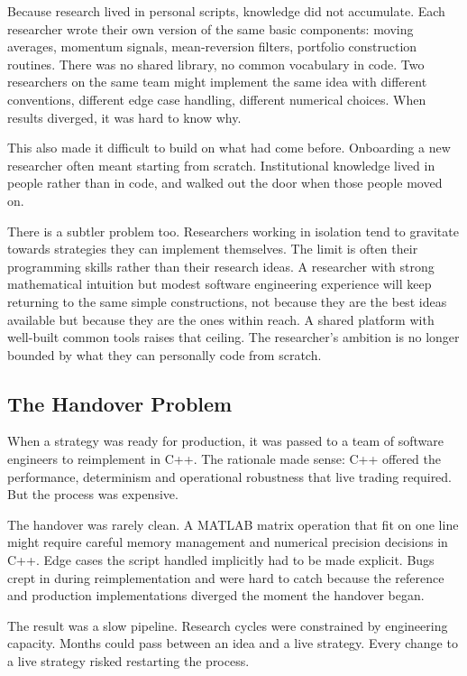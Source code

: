 \documentclass[
  11pt,
]{article}
\begin{document}
Because research lived in personal scripts, knowledge did not
accumulate. Each researcher wrote their own version of the same basic
components: moving averages, momentum signals, mean-reversion filters,
portfolio construction routines. There was no shared library, no common
vocabulary in code. Two researchers on the same team might implement the
same idea with different conventions, different edge case handling,
different numerical choices. When results diverged, it was hard to know
why.

This also made it difficult to build on what had come before. Onboarding
a new researcher often meant starting from scratch. Institutional
knowledge lived in people rather than in code, and walked out the door
when those people moved on.

There is a subtler problem too. Researchers working in isolation tend to
gravitate towards strategies they can implement themselves. The limit is
often their programming skills rather than their research ideas. A
researcher with strong mathematical intuition but modest software
engineering experience will keep returning to the same simple
constructions, not because they are the best ideas available but because
they are the ones within reach. A shared platform with well-built common
tools raises that ceiling. The researcher's ambition is no longer
bounded by what they can personally code from scratch.

\subsection{The Handover Problem}\label{the-handover-problem}

When a strategy was ready for production, it was passed to a team of
software engineers to reimplement in C++. The rationale made sense: C++
offered the performance, determinism and operational robustness that
live trading required. But the process was expensive.

The handover was rarely clean. A MATLAB matrix operation that fit on one
line might require careful memory management and numerical precision
decisions in C++. Edge cases the script handled implicitly had to be
made explicit. Bugs crept in during reimplementation and were hard to
catch because the reference and production implementations diverged the
moment the handover began.

The result was a slow pipeline. Research cycles were constrained by
engineering capacity. Months could pass between an idea and a live
strategy. Every change to a live strategy risked restarting the process.
\end{document}
